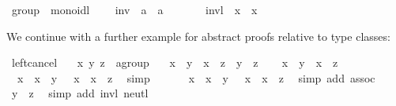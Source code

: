 \begin{isabellebody}
\ group\ {\isacharequal}\ monoidl\ {\isacharplus}\isanewline
\ \ \ inv\ {\isacharcolon}{\isacharcolon}\ {\isachardoublequoteopen}{\isacharprime}a\ {\isasymRightarrow}\ {\isacharprime}a{\isachardoublequoteclose}\ {\isacharparenleft}{\isachardoublequoteopen}{\isasymdiv}\ {\isacharunderscore}{\isachardoublequoteclose}\ {\isacharbrackleft}{}{}{\isacharbrackright}\ {}{}{\isacharparenright}\isanewline
\ \ \ invl{\isacharcolon}\ {\isachardoublequoteopen}{\isasymdiv}\ x\ {\isasymoplus}\ x\ {\isacharequal}\ {\isasymzero}{\isachardoublequoteclose}%
\begin{isamarkuptext}%
\noindent We continue with a further example for abstract
proofs relative to type classes:%
\end{isamarkuptext}%
\isamarkuptrue%
\isamarkupfalse%
\ left{\isacharunderscore}cancel{\isacharcolon}\isanewline
\ \ \ x\ y\ z\ {\isacharcolon}{\isacharcolon}\ {\isachardoublequoteopen}{\isacharprime}a{\isasymColon}group{\isachardoublequoteclose}\isanewline
\ \ \ {\isachardoublequoteopen}x\ {\isasymoplus}\ y\ {\isacharequal}\ x\ {\isasymoplus}\ z\ {\isasymlongleftrightarrow}\ y\ {\isacharequal}\ z{\isachardoublequoteclose}\isanewline
%
\isadelimproof
%
\endisadelimproof
%
\isatagproof
{}\isamarkupfalse%
\isanewline
\ \ \isamarkupfalse%
\ {\isachardoublequoteopen}x\ {\isasymoplus}\ y\ {\isacharequal}\ x\ {\isasymoplus}\ z{\isachardoublequoteclose}\isanewline
\ \ \isamarkupfalse%
\ \isamarkupfalse%
\ {\isachardoublequoteopen}{\isasymdiv}\ x\ {\isasymoplus}\ {\isacharparenleft}x\ {\isasymoplus}\ y{\isacharparenright}\ {\isacharequal}\ {\isasymdiv}\ x\ {\isasymoplus}\ {\isacharparenleft}x\ {\isasymoplus}\ z{\isacharparenright}{\isachardoublequoteclose}\ \isamarkupfalse%
\ simp\isanewline
\ \ \isamarkupfalse%
\ \isamarkupfalse%
\ {\isachardoublequoteopen}{\isacharparenleft}{\isasymdiv}\ x\ {\isasymoplus}\ x{\isacharparenright}\ {\isasymoplus}\ y\ {\isacharequal}\ {\isacharparenleft}{\isasymdiv}\ x\ {\isasymoplus}\ x{\isacharparenright}\ {\isasymoplus}\ z{\isachardoublequoteclose}\ \isamarkupfalse%
\ {\isacharparenleft}simp\ add{\isacharcolon}\ assoc{\isacharparenright}\isanewline
\ \ \isamarkupfalse%
\ \isamarkupfalse%
\ {\isachardoublequoteopen}y\ {\isacharequal}\ z{\isachardoublequoteclose}\ \isamarkupfalse%
\ {\isacharparenleft}simp\ add{\isacharcolon}\ invl\ neutl{\isacharparenright}\isanewline

\end{isabellebody}
